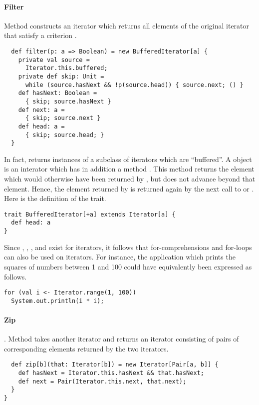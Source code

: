 \documentclass[a4paper,12pt,twoside,titlepage]{book}
\begin{document}
{\paragraph{Filter} Method  constructs an iterator which
returns all elements of the original iterator that satisfy a criterion
.
\begin{lstlisting}
  def filter(p: a => Boolean) = new BufferedIterator[a] {
    private val source = 
      Iterator.this.buffered;
    private def skip: Unit = 
      while (source.hasNext && !p(source.head)) { source.next; () }
    def hasNext: Boolean = 
      { skip; source.hasNext }
    def next: a = 
      { skip; source.next }
    def head: a = 
      { skip; source.head; }
  }
\end{lstlisting}
In fact,  returns instances of a subclass of iterators
which are ``buffered''.  A  object is an
interator which has in addition a method . This method
returns the element which would otherwise have been returned by
, but does not advance beyond that element. Hence, the
element returned by  is returned again by the next call to
 or . Here is the definition of the
 trait.
\begin{lstlisting}
trait BufferedIterator[+a] extends Iterator[a] {
  def head: a
}
\end{lstlisting}
Since , , , and 
exist for iterators, it follows that for-comprehensions and for-loops
can also be used on iterators. For instance, the application which prints the squares of numbers between 1 and 100 could have equivalently been expressed as follows.
\begin{lstlisting}
for (val i <- Iterator.range(1, 100))
  System.out.println(i * i);
\end{lstlisting}

\paragraph{Zip}. Method  takes another iterator and
returns an iterator consisting of pairs of corresponding elements
returned by the two iterators.
\begin{lstlisting}
  def zip[b](that: Iterator[b]) = new Iterator[Pair[a, b]] {
    def hasNext = Iterator.this.hasNext && that.hasNext;
    def next = Pair(Iterator.this.next, that.next);
  }
}
\end{lstlisting}

}
\end{document}
